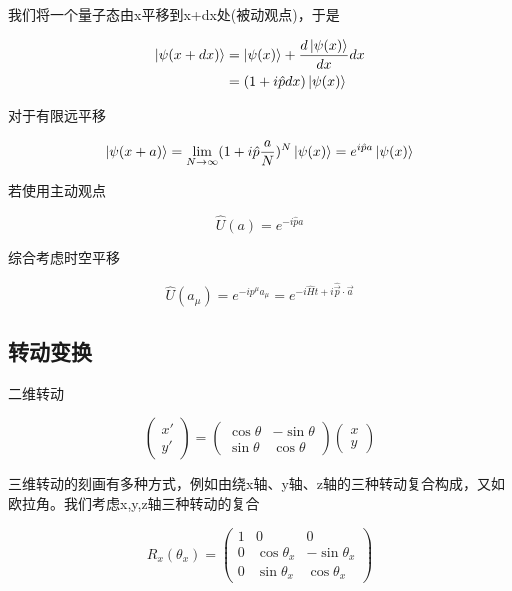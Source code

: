 我们将一个量子态由x平移到x+dx处(被动观点)，于是

\begin{equation}
    \begin{split}
        \ket{\psi(x+dx)}&= \ket{\psi(x)}+\frac{d\ket{\psi(x)}}{dx}dx \\
            &= (1+i\hat{p}dx)\ket{\psi(x)}
    \end{split}
\end{equation}

对于有限远平移

\begin{equation}
    \ket{\psi(x+a)}=\lim_{N\to\infty}(1+i\hat{p}\frac{a}{N})^N\ket{\psi(x)}=e^{i\hat{p}a}\ket{\psi(x)}
\end{equation}

若使用主动观点

\begin{equation}
    \hat{U}(a)=e^{-i\hat{p}a}
\end{equation}

综合考虑时空平移

\begin{equation}
    \hat{U}(a_\mu)=e^{-ip^\mu a_\mu}=e^{-i\hat{H}t+i\hat{\vec{p}}\cdot\vec{a}}
\end{equation}



\subsection{转动变换}

二维转动

\begin{equation}
    \left(\begin{matrix}
        x' \\ y'
    \end{matrix}\right) = \left(\begin{matrix}
        \cos\theta & -\sin\theta \\ \sin\theta & \cos\theta
    \end{matrix}\right) \left(\begin{matrix}
        x \\ y
    \end{matrix}\right)
\end{equation}

三维转动的刻画有多种方式，例如由绕x轴、y轴、z轴的三种转动复合构成，又如欧拉角。我们考虑x,y,z轴三种转动的复合

\begin{equation}
    R_x(\theta_x)=\left(\begin{matrix}
        1 & 0 & 0 \\
        0 & \cos\theta_x & -\sin\theta_x \\
        0 & \sin\theta_x & \cos\theta_x
    \end{matrix}\right)
\end{equation}

